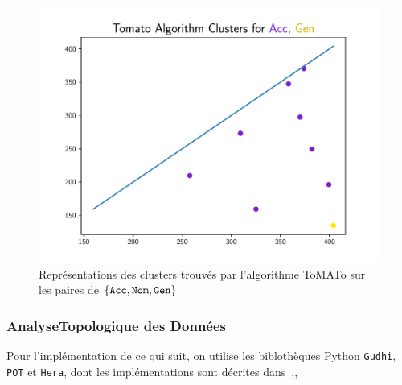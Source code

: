 \documentclass{cours}
\begin{document}
\begin{figure}[H]
\begin{minipage}{.5\textwidth}
	\begin{center}
	\includegraphics[width=\linewidth]{Figures/Visualisations/tomato_Acc_Gen_Nouns}
	\end{center}
\end{minipage}

\caption{Représentations des clusters trouvés par l'algorithme ToMATo sur les paires de $\{\tt Acc,Nom,Gen\}$}
\end{figure}

\subsubsection{AnalyseTopologique des Données}
Pour l'implémentation de ce qui suit, on utilise les biblothèques Python \texttt{Gudhi}, \texttt{POT} et \texttt{Hera}, dont les implémentations sont décrites dans~\cite{Gudhi},\cite{PythonPOT},~\cite{Hera}
\end{document}
